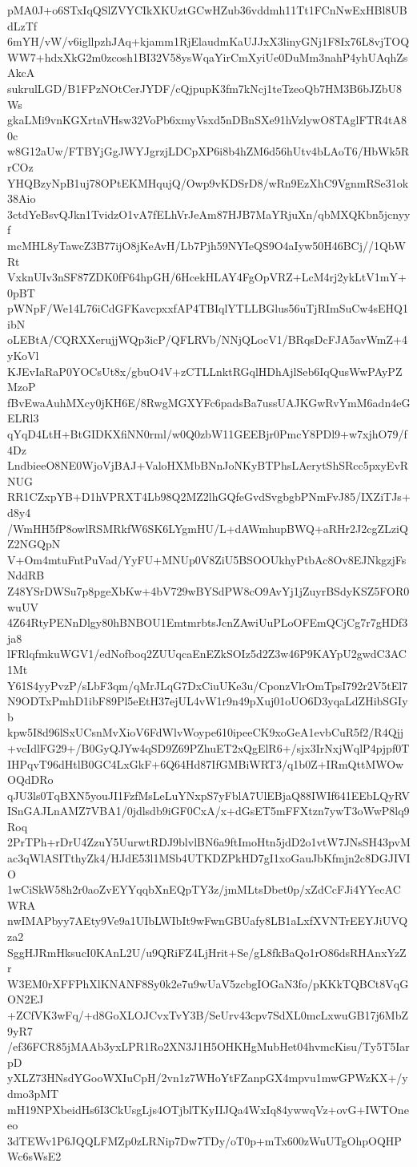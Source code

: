 pMA0J+o6STxIqQSlZVYCIkXKUztGCwHZub36vddmh11Tt1FCnNwExHBl8UBdLzTf
6mYH/vW/v6igllpzhJAq+kjamm1RjElaudmKaUJJxX3linyGNj1F8Ix76L8vjTOQ
WW7+hdxXkG2m0zcosh1BI32V58ysWqaYirCmXyiUe0DuMm3nahP4yhUAqhZsAkcA
sukrulLGD/B1FPzNOtCerJYDF/cQjpupK3fm7kNcj1teTzeoQb7HM3B6bJZbU8Ws
gkaLMi9vnKGXrtnVHsw32VoPb6xmyVsxd5nDBnSXe91hVzlywO8TAglFTR4tA80c
w8G12aUw/FTBYjGgJWYJgrzjLDCpXP6i8b4hZM6d56hUtv4bLAoT6/HbWk5RrCOz
YHQBzyNpB1uj78OPtEKMHqujQ/Owp9vKDSrD8/wRn9EzXhC9VgnmRSe31ok38Aio
3ctdYeBsvQJkn1TvidzO1vA7fELhVrJeAm87HJB7MaYRjuXn/qbMXQKbn5jcnyyf
mcMHL8yTawcZ3B77ijO8jKeAvH/Lb7Pjh59NYIeQS9O4aIyw50H46BCj//1QbWRt
VxknUIv3nSF87ZDK0fF64hpGH/6HcekHLAY4FgOpVRZ+LcM4rj2ykLtV1mY+0pBT
pWNpF/We14L76iCdGFKavcpxxfAP4TBIqlYTLLBGlus56uTjRImSuCw4sEHQ1ibN
oLEBtA/CQRXXerujjWQp3icP/QFLRVb/NNjQLocV1/BRqsDcFJA5avWmZ+4yKoVl
KJEvIaRaP0YOCsUt8x/gbuO4V+zCTLLnktRGqlHDhAjlSeb6IqQusWwPAyPZMzoP
fBvEwaAuhMXcy0jKH6E/8RwgMGXYFc6padsBa7ussUAJKGwRvYmM6adn4eGELRl3
qYqD4LtH+BtGIDKXfiNN0rml/w0Q0zbW11GEEBjr0PmcY8PDl9+w7xjhO79/f4Dz
LndbieeO8NE0WjoVjBAJ+ValoHXMbBNnJoNKyBTPhsLAerytShSRcc5pxyEvRNUG
RR1CZxpYB+D1hVPRXT4Lb98Q2MZ2lhGQfeGvdSvgbgbPNmFvJ85/IXZiTJs+d8y4
/WmHH5fP8owlRSMRkfW6SK6LYgmHU/L+dAWmhupBWQ+aRHr2J2cgZLziQZ2NGQpN
V+Om4mtuFntPuVad/YyFU+MNUp0V8ZiU5BSOOUkhyPtbAc8Ov8EJNkgzjFsNddRB
Z48YSrDWSu7p8pgeXbKw+4bV729wBYSdPW8cO9AvYj1jZuyrBSdyKSZ5FOR0wuUV
4Z64RtyPENnDlgy80hBNBOU1EmtmrbtsJcnZAwiUuPLoOFEmQCjCg7r7gHDf3ja8
lFRlqfmkuWGV1/edNofboq2ZUUqcaEnEZkSOIz5d2Z3w46P9KAYpU2gwdC3AC1Mt
Y61S4yyPvzP/sLbF3qm/qMrJLqG7DxCiuUKe3u/CponzVlrOmTpsI792r2V5tEl7
N9ODTxPmhD1ibF89Pl5eEtH37ejUL4vW1r9n49pXuj01oUO6D3yqaLdZHibSGIyb
kpw5I8d96lSxUCsnMvXioV6FdWlvWoype610ipeeCK9xoGeA1evbCuR5f2/R4Qjj
+vcIdlFG29+/B0GyQJYw4qSD9Z69PZhuET2xQgElR6+/sjx3IrNxjWqlP4pjpf0T
IHPqvT96dHtlB0GC4LxGkF+6Q64Hd87IfGMBiWRT3/q1b0Z+IRmQttMWOwOQdDRo
qJU3ls0TqBXN5youJI1FzfMsLeLuYNxpS7yFblA7UlEBjaQ88IWIf641EEbLQyRV
ISnGAJLnAMZ7VBA1/0jdlsdb9iGF0CxA/x+dGsET5mFFXtzn7ywT3oWwP8lq9Roq
2PrTPh+rDrU4ZzuY5UurwtRDJ9blvlBN6a9ftImoHtn5jdD2o1vtW7JNsSH43pvM
ac3qWlASITthyZk4/HJdE53l1MSb4UTKDZPkHD7gI1xoGauJbKfmjn2c8DGJIVIO
1wCiSkW58h2r0aoZvEYYqqbXnEQpTY3z/jmMLtsDbet0p/xZdCcFJi4YYecACWRA
nwIMAPbyy7AEty9Ve9a1UIbLWIbIt9wFwnGBUafy8LB1aLxfXVNTrEEYJiUVQza2
SggHJRmHksucI0KAnL2U/u9QRiFZ4LjHrit+Se/gL8fkBaQo1rO86dsRHAnxYzZr
W3EM0rXFFPhXlKNANF8Sy0k2e7u9wUaV5zcbgIOGaN3fo/pKKkTQBCt8VqGON2EJ
+ZCfVK3wFq/+d8GoXLOJCvxTvY3B/SeUrv43cpv7SdXL0mcLxwuGB17j6MbZ9yR7
/ef36FCR85jMAAb3yxLPR1Ro2XN3J1H5OHKHgMubHet04hvmcKisu/Ty5T5IarpD
yXLZ73HNsdYGooWXIuCpH/2vn1z7WHoYtFZanpGX4mpvu1mwGPWzKX+/ydmo3pMT
mH19NPXbeidHs6I3CkUsgLjs4OTjblTKyIIJQa4WxIq84ywwqVz+ovG+IWTOneeo
3dTEWv1P6JQQLFMZp0zLRNip7Dw7TDy/oT0p+mTx600zWuUTgOhpOQHPWc6sWsE2
